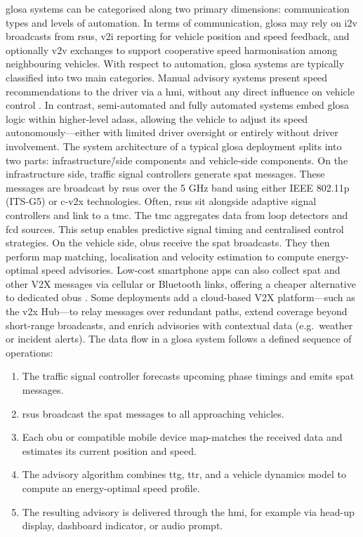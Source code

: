 \ac{glosa} systems can be categorised along two primary dimensions: communication types and levels of automation. In terms of communication, \ac{glosa} may rely on \ac{i2v} broadcasts from \acp{rsu}, \ac{v2i} reporting for vehicle position and speed feedback, and optionally \ac{v2v} exchanges to support cooperative speed harmonisation among neighbouring vehicles. \cite{Seredynski2013} With respect to automation, \ac{glosa} systems are typically classified into two main categories. Manual advisory systems present speed recommendations to the driver via a \ac{hmi}, without any direct influence on vehicle control \cite{BusesGLOSA2022}. In contrast, semi-automated and fully automated systems embed \ac{glosa} logic within higher-level \acp{adas}, allowing the vehicle to adjust its speed autonomously—either with limited driver oversight or entirely without driver involvement. \cite{Almannaa2019}
\mynewline
The system architecture of a typical \ac{glosa} deployment splits into two parts: infrastructure\=/side components and vehicle-side components. On the infrastructure side, traffic signal controllers generate \ac{spat} messages. These messages are broadcast by \acp{rsu} over the 5 GHz band using either IEEE 802.11p (ITS-G5) or \ac{c-v2x} technologies. Often, \acp{rsu} sit alongside adaptive signal controllers and link to a \ac{tmc}. The \ac{tmc} aggregates data from loop detectors and \ac{fcd} sources. This setup enables predictive signal timing and centralised control strategies.
On the vehicle side, \acp{obu} receive the \ac{spat} broadcasts. They then perform \ac{map} matching, localisation and velocity estimation to compute energy-optimal speed advisories. \cite{Sambeek2015} Low-cost smartphone apps can also collect \ac{spat} and other V2X messages via cellular or Bluetooth links, offering a cheaper alternative to dedicated \acp{obu} \cite{Gao2016}. Some deployments add a cloud-based V2X platform—such as the \ac{v2x} Hub—to relay messages over redundant paths, extend coverage beyond short-range broadcasts, and enrich advisories with contextual data (e.g.\ weather or incident alerts). \cite{Hadi2023}
\mynewline
The data flow in a \ac{glosa} system follows a defined sequence of operations:

\begin{enumerate}[leftmargin=*, label=\textbf{Step \arabic*:}]
  \item The traffic signal controller forecasts upcoming phase timings and emits \ac{spat} messages.
  \item \acp{rsu} broadcast the \ac{spat} messages to all approaching vehicles.
  \item Each \ac{obu} or compatible mobile device \ac{map}-matches the received data and estimates its current position and speed.
  \item The advisory algorithm combines \ac{ttg}, \ac{ttr}, and a vehicle dynamics model to compute an energy-optimal speed profile.
  \item The resulting advisory is delivered through the \ac{hmi}, for example via head-up display, dashboard indicator, or audio prompt.
\end{enumerate}

